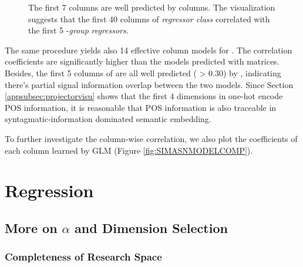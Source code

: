 \begin{figure}
    \centering
            \caption[Coefficients of \texttt{ASN} Columns Predicting \texttt{SIM}]{The first 7  columns are well predicted by  columns. The visualization suggests that the first 40 columns of  \emph{regressor class} correlated with the first 5 -\emph{group} \emph{regressors}.} 
            \label{fig:ASNSIMMODELCOMP}

\end{figure}

The same procedure yields also 14 effective column models for . The correlation coefficients are significantly higher than the models predicted with  matrices. Besides, the first 5 columns of  are all well predicted ( > 0.30) by , indicating there's partial signal information overlap between the two models. Since Section \ref{appsubsec:projectorvisu} shows that the first 4 dimensions in  one-hot encode POS information, it is reasonable that POS information is also traceable in syntagmatic-information dominated semantic embedding.

To further investigate the column-wise correlation, we also plot the coefficients of each  column learned by GLM (Figure \ref{fig:SIMASNMODELCOMP}). 

\section{Regression}
\subsection{More on \(\alpha\) and Dimension Selection}
\label{appsubsec:alphadim}

\subsubsection{Completeness of Research Space}

